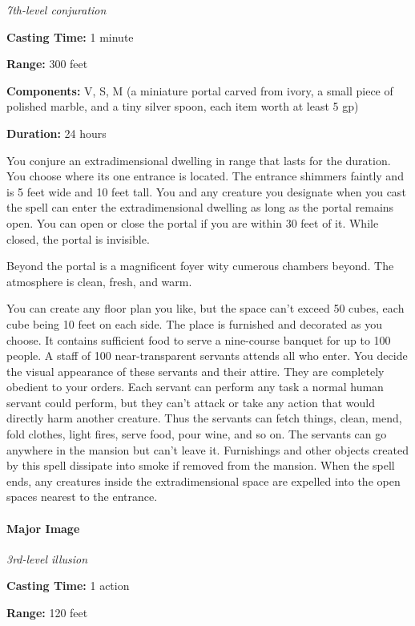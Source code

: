 \documentclass[
]{article}
\begin{document}
\emph{7th-level conjuration}

\textbf{Casting Time:} 1 minute

\textbf{Range:} 300 feet

\textbf{Components:} V, S, M (a miniature portal carved from ivory, a
small piece of polished marble, and a tiny silver spoon, each item worth
at least 5 gp)

\textbf{Duration:} 24 hours

You conjure an extradimensional dwelling in range that lasts for the
duration. You choose where its one entrance is located. The entrance
shimmers faintly and is 5 feet wide and 10 feet tall. You and any
creature you designate when you cast the spell can enter the
extradimensional dwelling as long as the portal remains open. You can
open or close the portal if you are within 30 feet of it. While closed,
the portal is invisible.

Beyond the portal is a magnificent foyer wity cumerous chambers beyond.
The atmosphere is clean, fresh, and warm.

You can create any floor plan you like, but the space can't exceed 50
cubes, each cube being 10 feet on each side. The place is furnished and
decorated as you choose. It contains sufficient food to serve a
nine-course banquet for up to 100 people. A staff of 100
near-transparent servants attends all who enter. You decide the visual
appearance of these servants and their attire. They are completely
obedient to your orders. Each servant can perform any task a normal
human servant could perform, but they can't attack or take any action
that would directly harm another creature. Thus the servants can fetch
things, clean, mend, fold clothes, light fires, serve food, pour wine,
and so on. The servants can go anywhere in the mansion but can't leave
it. Furnishings and other objects created by this spell dissipate into
smoke if removed from the mansion. When the spell ends, any creatures
inside the extradimensional space are expelled into the open spaces
nearest to the entrance.

\hypertarget{major-image}{%
\paragraph{Major Image}\label{major-image}}

\emph{3rd-level illusion}

\textbf{Casting Time:} 1 action

\textbf{Range:} 120 feet
\end{document}
